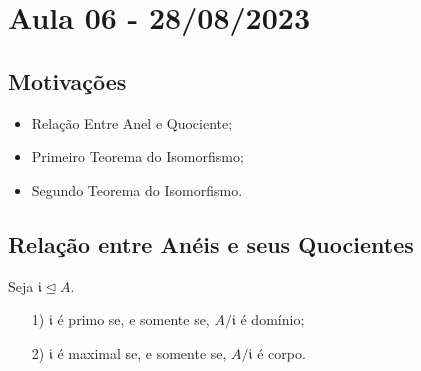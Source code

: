 \documentclass[algebraII_notes.tex]{subfiles}
\begin{document}
\section{Aula 06 - 28/08/2023}
\subsection{Motivações}
\begin{itemize}
	\item Relação Entre Anel e Quociente;
	\item Primeiro Teorema do Isomorfismo;
	\item Segundo Teorema do Isomorfismo.
\end{itemize}
\subsection{Relação entre Anéis e seus Quocientes}
\begin{prop*}
	Seja \(\mathfrak{i}\trianglelefteq{A}.\)
	\begin{itemize}
		\item[1)] \(\mathfrak{i}\) é primo se, e somente se, \(A/\mathfrak{i}\) é domínio;
		\item[2)] \(\mathfrak{i}\) é maximal se, e somente se, \(A/\mathfrak{i}\) é corpo.
	\end{itemize}
\end{prop*}
\end{document}
